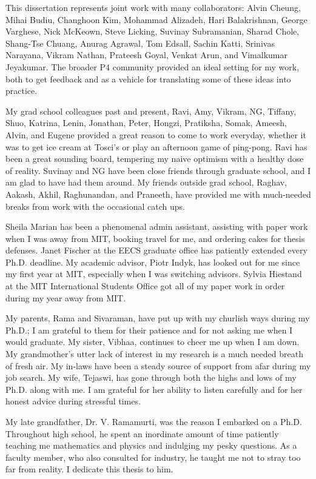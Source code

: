 This dissertation represents joint work with many collaborators: Alvin Cheung,
Mihai Budiu, Changhoon Kim, Mohammad Alizadeh, Hari Balakrishnan, George
Varghese, Nick McKeown, Steve Licking, Suvinay Subramanian, Sharad Chole,
Shang-Tse Chuang, Anurag Agrawal, Tom Edsall, Sachin Katti, Srinivas Narayana,
Vikram Nathan, Prateesh Goyal, Venkat Arun, and Vimalkumar Jeyakumar. The
broader P4 community provided an ideal setting for my work, both to get
feedback and as a vehicle for translating some of these ideas into practice. 

My grad school colleagues past and present, Ravi, Amy, Vikram, NG, Tiffany,
Shuo, Katrina, Lenin, Jonathan, Peter, Hongzi, Pratiksha, Somak, Ameesh, Alvin,
and Eugene provided a great reason to come to work everyday, whether it was to
get ice cream at Tosci's or play an afternoon game of ping-pong. Ravi has been
a great sounding board, tempering my naive optimism with a healthy dose of
reality. Suvinay and NG have been close friends through graduate school, and I
am glad to have had them around. My friends outside grad school, Raghav,
Aakash, Akhil, Raghunandan, and Praneeth, have provided me with much-needed
breaks from work with the occasional catch ups.

Sheila Marian has been a phenomenal admin assistant, assisting with paper work
when I was away from MIT, booking travel for me, and ordering cakes for thesis
defenses. Janet Fischer at the EECS graduate office has patiently extended
every Ph.D.  deadline. My academic advisor, Piotr Indyk, has looked out for me
since my first year at MIT, especially when I was switching advisors.  Sylvia
Hiestand at the MIT International Students Office got all of my paper work in
order during my year away from MIT.

My parents, Rama and Sivaraman, have put up with my churlish ways during my
Ph.D.; I am grateful to them for their patience and for not asking me when I
would graduate. My sister, Vibhaa, continues to cheer me up when I am down.  My
grandmother's utter lack of interest in my research is a much needed breath of
fresh air. My in-laws have been a steady source of support from afar during my
job search. My wife, Tejaswi, has gone through both the highs and lows of my
Ph.D. along with me. I am grateful for her ability to listen carefully and for
her honest advice during stressful times. 

My late grandfather, Dr. V. Ramamurti, was the reason I embarked on a Ph.D.
Throughout high school, he spent an inordinate amount of time patiently
teaching me mathematics and physics and indulging my pesky questions. As a
faculty member, who also consulted for industry, he taught me not to stray too
far from reality. I dedicate this thesis to him.
